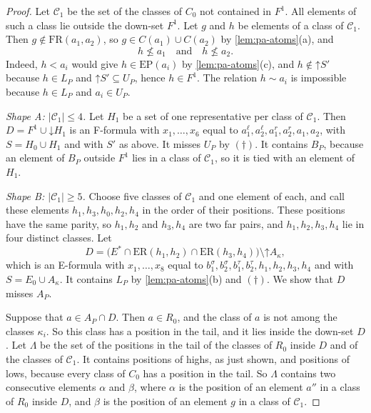 \documentclass[pdflatex,sn-mathphys-num]{sn-jnl}%
\theoremstyle{thmstyleone}%
\theoremstyle{thmstyletwo}%
\theoremstyle{thmstylethree}%
\newcommand{\dn}{\mathord{\downarrow}}%
\newcommand{\upp}{\mathord{\uparrow}}%
\newcommand{\FR}{\mathrm{FR}}%
\newcommand{\ER}{\mathrm{ER}}%
\newcommand{\EP}{\mathrm{EP}}%
\begin{document}
\begin{proof}
Let $\mathcal{C}_1$ be the set of the classes of $C_0$ not contained in $F^1$.
All elements of such a class lie outside the down-set $F^1$.
Let $g$ and $h$ be elements of a class of $\mathcal{C}_1$.
Then $g \notin \FR(a_1, a_2)$, so $g \in C(a_1) \cup C(a_2)$ by \cref{lem:pa-atoms}(a), and
\begin{equation}
\label{eq:pa-not-below}
h \not\leq a_1 \quad\text{and}\quad h \not\leq a_2.
\end{equation}
Indeed, $h < a_i$ would give $h \in \EP(a_i)$ by \cref{lem:pa-atoms}(c), and $h \notin \upp S'$ because $h \in L_P$ and $\upp S' \subseteq U_P$, hence $h \in F^1$.
The relation $h \sim a_i$ is impossible because $h \in L_P$ and $a_i \in U_P$.

\emph{Shape A: $|\mathcal{C}_1| \leq 4$.}
Let $H_1$ be a set of one representative per class of $\mathcal{C}_1$.
Then $D = F^1 \cup \dn H_1$ is an F-formula with $x_1, \dots, x_6$ equal to $a^\ell_1, a^\ell_2, a^r_1, a^r_2, a_1, a_2$, with $S = H_0 \cup H_1$ and with $S'$ as above.
It misses $U_P$ by $(\dagger)$.
It contains $B_P$, because an element of $B_P$ outside $F^1$ lies in a class of $\mathcal{C}_1$, so it is tied with an element of $H_1$.

\emph{Shape B: $|\mathcal{C}_1| \geq 5$.}
Choose five classes of $\mathcal{C}_1$ and one element of each, and call these elements $h_1, h_3, h_0, h_2, h_4$ in the order of their positions.
These positions have the same parity, so $h_1, h_2$ and $h_3, h_4$ are two far pairs, and $h_1, h_2, h_3, h_4$ lie in four distinct classes.
Let
\[
D = \bigl(E^* \cap \ER(h_1, h_2) \cap \ER(h_3, h_4)\bigr) \setminus \upp A_\kappa,
\]
which is an E-formula with $x_1, \dots, x_8$ equal to $b^\sigma_1, b^\sigma_2, b^\tau_1, b^\tau_2, h_1, h_2, h_3, h_4$ and with $S = E_0 \cup A_\kappa$.
It contains $L_P$ by \cref{lem:pa-atoms}(b) and $(\dagger)$.
We show that $D$ misses $A_P$.

Suppose that $a \in A_P \cap D$.
Then $a \in R_0$, and the class of $a$ is not among the classes $\kappa_i$.
So this class has a position in the tail, and it lies inside the down-set $D$.
Let $\Lambda$ be the set of the positions in the tail of the classes of $R_0$ inside $D$ and of the classes of $\mathcal{C}_1$.
It contains positions of highs, as just shown, and positions of lows, because every class of $C_0$ has a position in the tail.
So $\Lambda$ contains two consecutive elements $\alpha$ and $\beta$, where $\alpha$ is the position of an element $a''$ in a class of $R_0$ inside $D$, and $\beta$ is the position of an element $g$ in a class of $\mathcal{C}_1$.


\end{proof}
\end{document}
